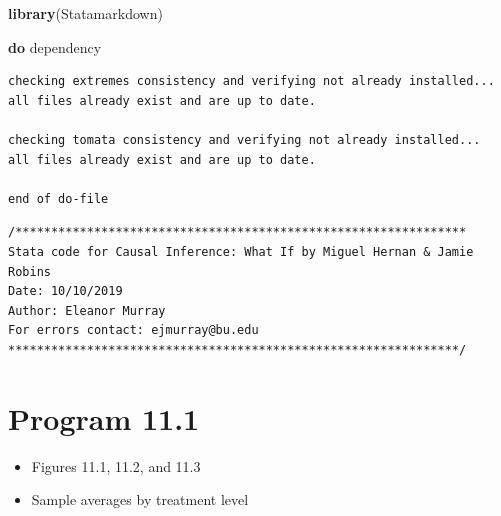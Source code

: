 \documentclass[
  10pt,
]{book}
\newenvironment{Shaded}{\begin{snugshade}}{\end{snugshade}}
\newcommand{\KeywordTok}[1]{\textcolor[rgb]{0.13,0.29,0.53}{\textbf{#1}}}
\newcommand{\NormalTok}[1]{#1}
\providecommand{\tightlist}{%
  \setlength{\itemsep}{0pt}\setlength{\parskip}{0pt}}
\begin{document}
\begin{Shaded}
\begin{Highlighting}[]
\KeywordTok{library}\NormalTok{(Statamarkdown)}
\end{Highlighting}
\end{Shaded}

\begin{Shaded}
\begin{Highlighting}[]
\KeywordTok{do}\NormalTok{ dependency}
\end{Highlighting}
\end{Shaded}

\begin{verbatim}
checking extremes consistency and verifying not already installed...
all files already exist and are up to date.

checking tomata consistency and verifying not already installed...
all files already exist and are up to date.

end of do-file
\end{verbatim}

\begin{verbatim}
/***************************************************************
Stata code for Causal Inference: What If by Miguel Hernan & Jamie Robins
Date: 10/10/2019
Author: Eleanor Murray 
For errors contact: ejmurray@bu.edu
***************************************************************/
\end{verbatim}

\hypertarget{program-11.1}{%
\section{Program 11.1}\label{program-11.1}}

\begin{itemize}
\tightlist
\item
  Figures 11.1, 11.2, and 11.3
\item
  Sample averages by treatment level
\end{itemize}
\end{document}
